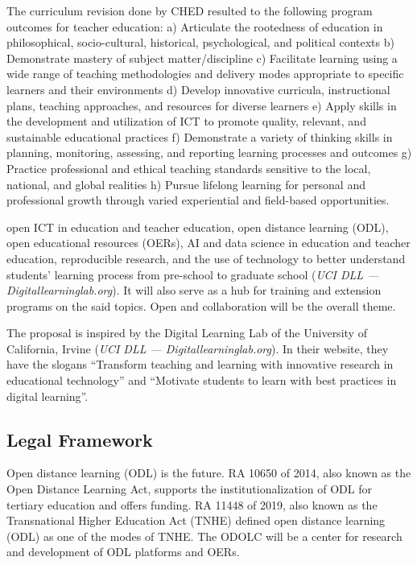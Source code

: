 \documentclass[
  12pt,
  foliopaper,
  DIV=11,
  numbers=noendperiod]{scrartcl}
\begin{document}
The curriculum revision done by CHED resulted to the following program
outcomes for teacher education: a) Articulate the rootedness of
education in philosophical, socio-cultural, historical, psychological,
and political contexts b) Demonstrate mastery of subject
matter/discipline c) Facilitate learning using a wide range of teaching
methodologies and delivery modes appropriate to specific learners and
their environments d) Develop innovative curricula, instructional plans,
teaching approaches, and resources for diverse learners e) Apply skills
in the development and utilization of ICT to promote quality, relevant,
and sustainable educational practices f) Demonstrate a variety of
thinking skills in planning, monitoring, assessing, and reporting
learning processes and outcomes g) Practice professional and ethical
teaching standards sensitive to the local, national, and global
realities h) Pursue lifelong learning for personal and professional
growth through varied experiential and field-based opportunities.

open ICT in education and teacher education, open distance learning
(ODL), open educational resources (OERs), AI and data science in
education and teacher education, reproducible research, and the use of
technology to better understand students' learning process from
pre-school to graduate school (\emph{{U}{C}{I} {D}{L}{L} ---
Digitallearninglab.org}). It will also serve as a hub for training and
extension programs on the said topics. Open and collaboration will be
the overall theme.

The proposal is inspired by the Digital Learning Lab of the University
of California, Irvine (\emph{{U}{C}{I} {D}{L}{L} ---
Digitallearninglab.org}). In their website, they have the slogans
``Transform teaching and learning with innovative research in
educational technology'' and ``Motivate students to learn with best
practices in digital learning''.

\hypertarget{legal-framework}{%
\subsection{Legal Framework}\label{legal-framework}}

Open distance learning (ODL) is the future. RA 10650 of 2014, also known
as the Open Distance Learning Act, supports the institutionalization of
ODL for tertiary education and offers funding. RA 11448 of 2019, also
known as the Transnational Higher Education Act (TNHE) defined open
distance learning (ODL) as one of the modes of TNHE. The ODOLC will be a
center for research and development of ODL platforms and OERs.
\end{document}
